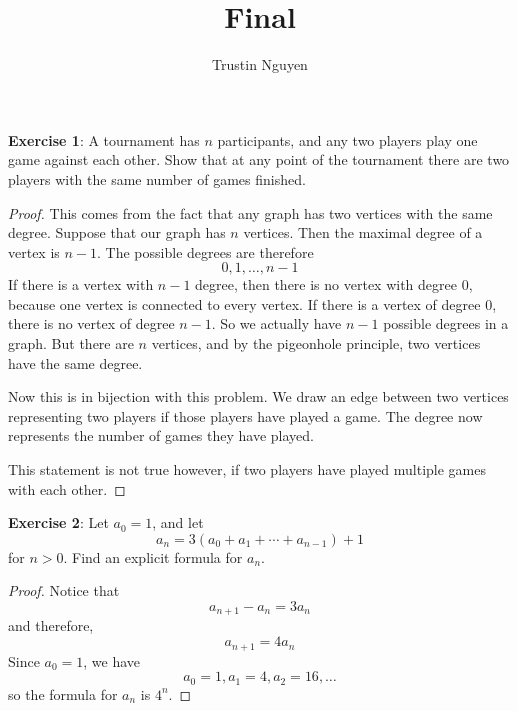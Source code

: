\documentclass{article}
\title{Final}
\author{Trustin Nguyen}
\begin{document}
    \maketitle

\reversemarginpar

\textbf{Exercise 1}: A tournament has $n$ participants, and any two players play one game against each other. Show that at any point of the tournament there are two players with the same number of games finished.
    \begin{proof}
        This comes from the fact that any graph has two vertices with the same degree. Suppose that our graph has $n$ vertices. Then the maximal degree of a vertex is $n - 1$. The possible degrees are therefore
            \begin{equation*}
                0, 1, \ldots, n - 1
            \end{equation*}
        If there is a vertex with $n - 1$ degree, then there is no vertex with degree $0$, because one vertex is connected to every vertex. If there is a vertex of degree $0$, there is no vertex of degree $n - 1$. So we actually have $n - 1$ possible degrees in a graph. But there are $n$ vertices, and by the pigeonhole principle, two vertices have the same degree. 

        Now this is in bijection with this problem. We draw an edge between two vertices representing two players if those players have played a game. The degree now represents the number of games they have played.

        This statement is not true however, if two players have played multiple games with each other.
    \end{proof}

\textbf{Exercise 2}: Let $a_{0} = 1$, and let 
    \begin{equation*}
        a_{n} = 3(a_{0} + a_{1} + \cdots + a_{n - 1}) + 1
    \end{equation*}
for $n > 0$. Find an explicit formula for $a_{n}$.
    \begin{proof}
        Notice that
            \begin{equation*}
                a_{n + 1} - a_{n} = 3a_{n}
            \end{equation*}
        and therefore,
            \begin{equation*}
                a_{n + 1} = 4a_{n}
            \end{equation*}
        Since $a_{0} = 1$, we have
            \begin{equation*}
                a_{0} = 1, a_{1} = 4, a_{2} = 16, \ldots
            \end{equation*}
        so the formula for $a_{n}$ is $4^{n}$.
    \end{proof}
\end{document}
